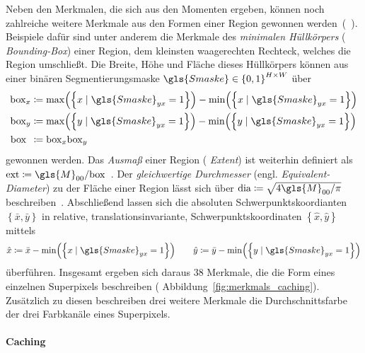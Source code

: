 Neben den Merkmalen, die sich aus den Momenten ergeben, können noch zahlreiche weitere Merkmale aus den Formen einer Region gewonnen werden~(\vgl{}~\cite{Siedhoff}).
Beispiele dafür sind unter anderem die Merkmale des \emph{minimalen Hüllkörpers} (\engl{} \emph{Bounding-Box}) einer Region, \dhe{} dem kleinsten waagerechten Rechteck, welches die Region umschließt.
Die Breite, Höhe und Fläche dieses Hüllkörpers können aus einer binären Segmentierungsmaske $\gls{Smaske} \in {\left\{0,1\right\}}^{H \times W}$ über
\begin{equation*}
\begin{split}
  \mathrm{box}_x & \coloneqq \max\left(\left\{x \mid \gls{Smaske}_{yx} = 1\right\}\right) - \min\left(\left\{x \mid \gls{Smaske}_{yx} = 1\right\}\right)\\
  \mathrm{box}_y & \coloneqq \max\left(\left\{y \mid \gls{Smaske}_{yx} = 1\right\}\right) - \min\left(\left\{y \mid \gls{Smaske}_{yx} = 1\right\}\right)\\
  \mathrm{box}_{\,\,\,} & \coloneqq \mathrm{box}_x \mathrm{box}_y
\end{split}
\end{equation*}
gewonnen werden.
Das \emph{Ausmaß} einer Region (\engl{} \emph{Extent}) ist weiterhin definiert als $\mathrm{ext} \coloneqq \gls{M}_{00}/\mathrm{box}$~\cite{scikit}.
Der \emph{gleichwertige Durchmesser} (engl. \emph{Equivalent-Di\-a\-me\-ter}) zu der Fläche einer Region lässt sich über $\mathrm{dia} \coloneqq \sqrt{4 \gls{M}_{00}/\pi}$ beschreiben~\cite{scikit, Siedhoff}.
Abschließend lassen sich die absoluten Schwerpunktskoordianten $\left\{\bar{x}, \bar{y}\right\}$ in relative, \dhe{} translationsinvariante, Schwerpunktskoordinaten $\left\{\hat{x}, \hat{y}\right\}$ mittels
\begin{equation*}
  \hat{x} \coloneqq \bar{x} - \min\left(\left\{x \mid \gls{Smaske}_{yx} = 1\right\}\right)
  \qquad
  \hat{y} \coloneqq \bar{y} - \min\left(\left\{y \mid \gls{Smaske}_{yx} = 1\right\}\right)
\end{equation*}
überführen.
Insgesamt ergeben sich daraus $38$ Merkmale, die die Form eines einzelnen Superpixels beschreiben (\vgl{} Abbildung~\ref{fig:merkmals_caching}).
Zusätzlich zu diesen beschreiben drei weitere Merkmale die Durchschnittsfarbe der drei Farbkanäle eines Superpixels.

\paragraph{Caching}
\label{Caching}

